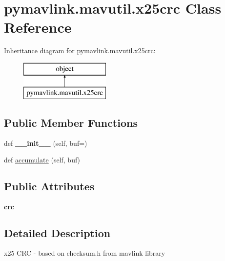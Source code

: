 \hypertarget{classpymavlink_1_1mavutil_1_1x25crc}{}\section{pymavlink.\+mavutil.\+x25crc Class Reference}
\label{classpymavlink_1_1mavutil_1_1x25crc}
Inheritance diagram for pymavlink.\+mavutil.\+x25crc\+:\begin{figure}[H]
\begin{center}
\leavevmode
\includegraphics[height=2.000000cm]{classpymavlink_1_1mavutil_1_1x25crc}
\end{center}
\end{figure}
\subsection*{Public Member Functions}
\begin{DoxyCompactItemize}
\item 
\mbox{\label{classpymavlink_1_1mavutil_1_1x25crc_a2ea5688ad6f11d1458495c83b5fb8369}} 
def {\bfseries \+\_\+\+\_\+init\+\_\+\+\_\+} (self, buf=\textquotesingle{}\textquotesingle{})
\item 
def \hyperlink{classpymavlink_1_1mavutil_1_1x25crc_a0b923d79c74f524672adb0dc2ab0c337}{accumulate} (self, buf)
\end{DoxyCompactItemize}
\subsection*{Public Attributes}
\begin{DoxyCompactItemize}
\item 
\mbox{\label{classpymavlink_1_1mavutil_1_1x25crc_a89ee93fb5da26919551f8765f70f476c}} 
{\bfseries crc}
\end{DoxyCompactItemize}


\subsection{Detailed Description}
\begin{DoxyVerb}x25 CRC - based on checksum.h from mavlink library\end{DoxyVerb}
 

